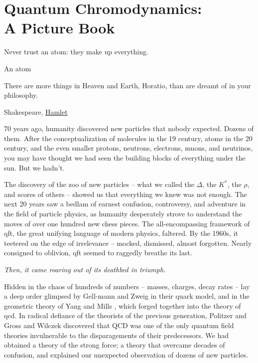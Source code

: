 \chapter[Quantum Chromodynamics (QCD): A Picture Book]{Quantum Chromodynamics:\\A Picture Book}

\label{chap:picturebook}

\epigraph{Never trust an atom: they make up everything.}{An atom}

\epigraph{There are more things in Heaven and Earth, Horatio, than are dreamt of in your philosophy.}{Shakespeare, \underline{Hamlet}}


70 years ago, humanity discovered new particles that nobody expected.
%
Dozens of them.
%
After the conceptualization of molecules in the 19\th{} century, atoms in the 20\th{} century, and the even smaller protons, neutrons, electrons, muons, and neutrinos, you may have thought we had seen the building blocks of everything under the sun.
%
But we hadn't.

The discovery of the zoo of new particles -- what we called the \(\Delta\), the \(K^*\), the \(\rho\), and scores of others -- showed us that everything we knew was not enough.
%
The next 20 years saw a bedlam of earnest confusion, controversy, and adventure in the field of particle physics, as humanity desperately strove to understand the moves of over one hundred new chess pieces.
%
The all-encompassing framework of \gls{qft}, the great unifying language of modern physics, faltered.
%
By the 1960s, it teetered on the edge of irrelevance -- mocked, dismissed, almost forgotten.
%
Nearly consigned to oblivion, \gls{qft} seemed to raggedly breathe its last.

\textit{Then, it came roaring out of its deathbed in triumph.}

Hidden in the chaos of hundreds of numbers -- masses, charges, decay rates -- lay a deep order glimpsed by Gell-mann \cite{Gell-Mann:1964ewy} and Zweig \cite{Zweig:1964ruk,Zweig:1964jf} in their quark model, and in the geometric theory of Yang and Mills \cite{Yang:1954ek}, which forged together into the theory of \gls{qcd}.
%
In radical defiance of the theorists of the previous generation, Politzer \cite{Politzer:1973fx} and Gross and Wilczek \cite{Gross:1973ju} discovered that QCD was one of the only quantum field theories invulnerable to the disparagements of their predecessors.
%
We had obtained a theory of the strong force;
%
a theory that overcame decades of confusion, and explained our unexpected observation of dozens of new particles.

